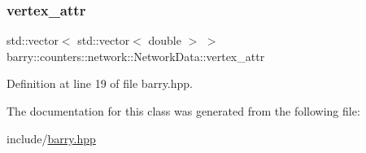 \subsubsection{\texorpdfstring{vertex\+\_\+attr}{vertex\_attr}}
{\footnotesize\ttfamily std\+::vector$<$ std\+::vector$<$ double $>$ $>$ barry\+::counters\+::network\+::\+Network\+Data\+::vertex\+\_\+attr}



Definition at line 19 of file barry.\+hpp.



The documentation for this class was generated from the following file\+:\begin{DoxyCompactItemize}
\item 
include/\hyperlink{barry_8hpp}{barry.\+hpp}\end{DoxyCompactItemize}
